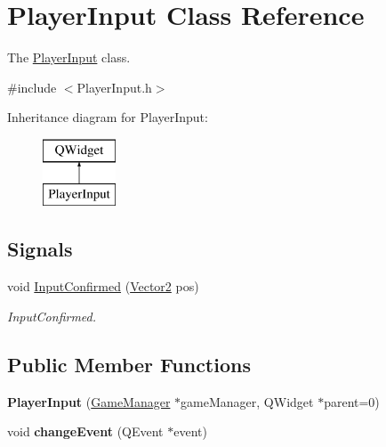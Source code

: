 \hypertarget{classPlayerInput}{\section{Player\-Input Class Reference}
\label{classPlayerInput}
}


The \hyperlink{classPlayerInput}{Player\-Input} class.  




{\ttfamily \#include $<$Player\-Input.\-h$>$}

Inheritance diagram for Player\-Input\-:\begin{figure}[H]
\begin{center}
\leavevmode
\includegraphics[height=2.000000cm]{classPlayerInput}
\end{center}
\end{figure}
\subsection*{Signals}
\begin{DoxyCompactItemize}
\item 
void \hyperlink{classPlayerInput_aab7de51daaa958792ffaae64e41f43e6}{Input\-Confirmed} (\hyperlink{structVector2}{Vector2} pos)
\begin{DoxyCompactList}\small\item\em Input\-Confirmed. \end{DoxyCompactList}\end{DoxyCompactItemize}
\subsection*{Public Member Functions}
\begin{DoxyCompactItemize}
\item 
\hypertarget{classPlayerInput_a41adeb104eebbd46404b0a29203441c5}{{\bfseries Player\-Input} (\hyperlink{classGameManager}{Game\-Manager} $\ast$game\-Manager, Q\-Widget $\ast$parent=0)}\label{classPlayerInput_a41adeb104eebbd46404b0a29203441c5}

\item 
\hypertarget{classPlayerInput_ab8abc1017f5b0e8589fbf1b8b550eba4}{void {\bfseries change\-Event} (Q\-Event $\ast$event)}\label{classPlayerInput_ab8abc1017f5b0e8589fbf1b8b550eba4}

\end{DoxyCompactItemize}


